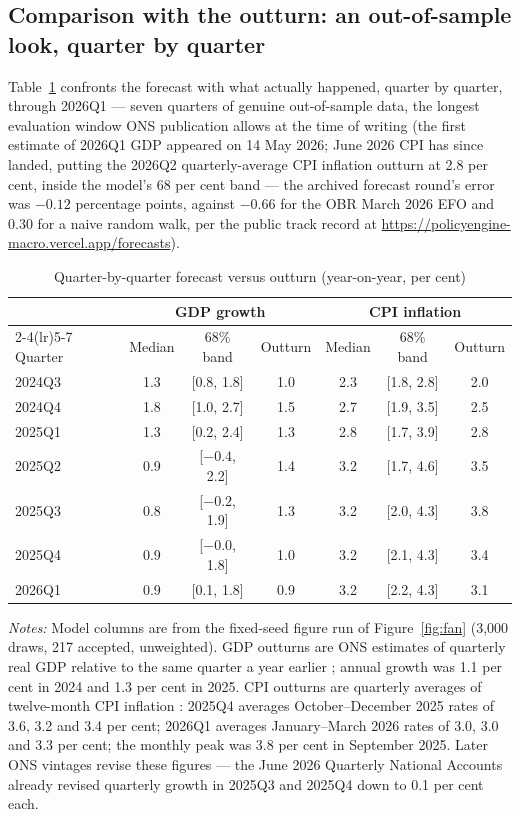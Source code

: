 \subsection{Comparison with the outturn: an out-of-sample look, quarter by quarter}

Table~\ref{tab:quarterly} confronts the forecast with what actually happened, quarter by quarter, through 2026Q1 --- seven quarters of genuine out-of-sample data, the longest evaluation window ONS publication allows at the time of writing (the first estimate of 2026Q1 GDP appeared on 14 May 2026; June 2026 CPI has since landed, putting the 2026Q2 quarterly-average CPI inflation outturn at 2.8 per cent, inside the model's 68 per cent band --- the archived forecast round's error was $-0.12$ percentage points, against $-0.66$ for the OBR March 2026 EFO and 0.30 for a naive random walk, per the public track record at \url{https://policyengine-macro.vercel.app/forecasts}).

\begin{table}[t]
\centering
\caption{Quarter-by-quarter forecast versus outturn (year-on-year, per cent)}
\label{tab:quarterly}
\small
\begin{tabular}{lcccccc}
\toprule
 & \multicolumn{3}{c}{GDP growth} & \multicolumn{3}{c}{CPI inflation} \\
\cmidrule(lr){2-4}\cmidrule(lr){5-7}
Quarter & Median & 68\% band & Outturn & Median & 68\% band & Outturn \\
\midrule
2024Q3 & 1.3 & [0.8, 1.8] & 1.0 & 2.3 & [1.8, 2.8] & 2.0 \\
2024Q4 & 1.8 & [1.0, 2.7] & 1.5 & 2.7 & [1.9, 3.5] & 2.5 \\
2025Q1 & 1.3 & [0.2, 2.4] & 1.3 & 2.8 & [1.7, 3.9] & 2.8 \\
2025Q2 & 0.9 & [$-0.4$, 2.2] & 1.4 & 3.2 & [1.7, 4.6] & 3.5 \\
2025Q3 & 0.8 & [$-0.2$, 1.9] & 1.3 & 3.2 & [2.0, 4.3] & 3.8 \\
2025Q4 & 0.9 & [$-0.0$, 1.8] & 1.0 & 3.2 & [2.1, 4.3] & 3.4 \\
2026Q1 & 0.9 & [0.1, 1.8] & 0.9 & 3.2 & [2.2, 4.3] & 3.1 \\
\bottomrule
\end{tabular}
\par\smallskip
\parbox{0.95\textwidth}{\footnotesize \emph{Notes:} Model columns are from the fixed-seed figure run of Figure~\ref{fig:fan} (3{,}000 draws, 217 accepted, unweighted). GDP outturns are ONS estimates of quarterly real GDP relative to the same quarter a year earlier \citep{ons2025gdp, ons2026gdp}; annual growth was 1.1 per cent in 2024 and 1.3 per cent in 2025. CPI outturns are quarterly averages of twelve-month CPI inflation \citep{ons2025cpi, ons2026cpi}: 2025Q4 averages October--December 2025 rates of 3.6, 3.2 and 3.4 per cent; 2026Q1 averages January--March 2026 rates of 3.0, 3.0 and 3.3 per cent; the monthly peak was 3.8 per cent in September 2025. Later ONS vintages revise these figures --- the June 2026 Quarterly National Accounts already revised quarterly growth in 2025Q3 and 2025Q4 down to 0.1 per cent each.}
\end{table}

